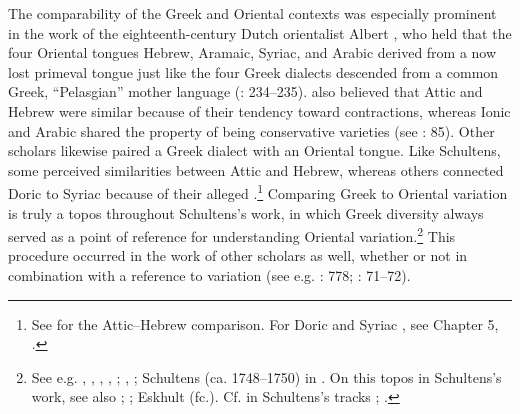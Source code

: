 The comparability of the Greek and Oriental contexts was especially prominent in the work of the eighteenth-century Dutch orientalist Albert \citeauthor{Schultens1739}, who held that the four Oriental tongues Hebrew, Aramaic, Syriac, and Arabic derived from a now lost primeval tongue just like the four Greek dialects descended from a common Greek, “Pelasgian” mother language (\citeyear{Schultens1739}: 234–235). \citet[\textsc{xcvi}]{Schultens1748} also believed that Attic and Hebrew were similar because of their tendency toward contractions, whereas Ionic and Arabic shared the property of being conservative varieties (see \citealt{Eskhult2015}: 85). Other scholars likewise paired a Greek dialect with an Oriental tongue. Like Schultens, some perceived similarities between Attic and Hebrew, whereas others connected Doric to Syriac because of their alleged .\footnote{See \citet[425--432]{Lakemacher1730} for the Attic–Hebrew comparison. For Doric and Syriac , see Chapter 5, .} Comparing Greek to Oriental variation is truly a topos throughout Schultens’s work, in which Greek diversity always served as a point of reference for understanding Oriental variation.\footnote{See e.g. \citet[490]{Schultens1769}, \citet[4]{Schultens1732}, \citet[5]{Schultens1737}, \citet[19--21]{Schultens1738a}, \citet[106--107, stressing that the Oriental and the Germanic contexts were less comparable]{Schultens1738b}; \citet[187]{Schultens1739}, \citet[\textsc{xcvi}]{Schultens1748}; Schultens (ca. 1748–1750) in \citet[§\textsc{xxvii}]{Eskhult_albert_nodate}. On this topos in Schultens’s work, see also \citet[105]{Fuck1955}; \citet[707]{Covington1979}; Eskhult (fc.). Cf. in Schultens’s tracks \citet[5]{Polier1739}; \citet{Groddeck1747}.} This procedure occurred in the work of other scholars as well, whether or not in combination with a reference to  variation (see e.g. \citealt{Bochart1646}: 778; \citealt{Blount1680}: 71–72).

